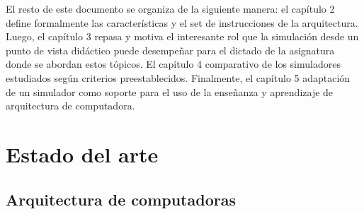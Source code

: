\documentclass[12pt,twoside]{templates/unerthesis}
\begin{document}
El resto de este documento se organiza de la siguiente manera: el capítulo 2 define formalmente las características y el set de instrucciones de la arquitectura. Luego, el capítulo 3 repasa y motiva el interesante rol que la simulación desde un punto de vista didáctico puede desempeñar para el dictado de la asignatura donde se abordan estos tópicos. El capítulo 4 comparativo de los simuladores estudiados según criterios preestablecidos. Finalmente, el capítulo 5 adaptación de un simulador como soporte para el uso de la enseñanza y aprendizaje de arquitectura de computadora.

\hypertarget{estado-del-arte}{%
\chapter{Estado del arte}\label{estado-del-arte}}

\hypertarget{arquitectura-de-computadoras}{%
\section{Arquitectura de computadoras}\label{arquitectura-de-computadoras}}
\end{document}
